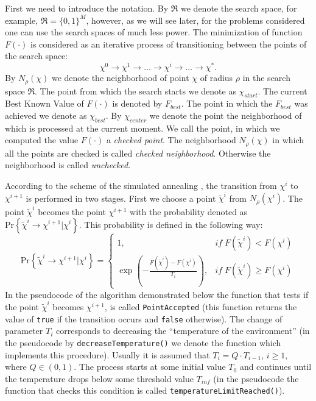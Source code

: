 \documentclass[runningheads,a4paper]{llncs}
\begin{document}
First we need to introduce the notation. By $\Re$ we denote the search space, for example, $\Re=\{0,1\}^M$, however, as we will see later, for the problems considered one can use the search spaces of much less power. The minimization of function $F(\cdot)$ is considered as an iterative process of transitioning between the points of the search space:
\begin{equation*}
\chi^0\rightarrow\chi^1\rightarrow\ldots\rightarrow\chi^i\rightarrow\ldots\rightarrow\chi^{\ast}.
\end{equation*}
By $N_{\rho}\left(\chi\right)$ we denote the neighborhood of point $\chi$ of radius $\rho$ in the search space $\Re$. The point from which the search starts we denote as $\chi_{start}$. The current Best Known Value of $F(\cdot)$ is denoted by $F_{best}$. The point in which the $F_{best}$ was achieved we denote as $\chi_{best}$. By $\chi_{center}$ we denote the point the neighborhood of which is processed at the current moment. We call the point, in which we computed the value $F(\cdot)$ a \textit{checked point}. The neighborhood $N_{\rho}\left(\chi\right)$ in which all the points are checked is called \textit{checked neighborhood}. Otherwise the neighborhood is called \textit{unchecked}. 

According to the scheme of the simulated annealing \cite{Kirkpatrick83optimizationby}, the transition from $\chi^i$ to $\chi^{i+1}$ is performed in two stages. First we choose a point $\tilde{\chi}^i$ from $N_{\rho}\left(\chi^i\right)$. The point $\tilde{\chi}^i$ becomes the point $\chi^{i+1}$ with the probability denoted as $\mathrm{Pr}\left\{\tilde{\chi}^i\rightarrow\chi^{i+1}|\chi^i\right\}$. This probability is defined in the following way:
\begin{equation*}
\mathrm{Pr}\left\{\tilde{\chi}^i\rightarrow\chi^{i+1}|\chi^i\right\}=\left\{
\begin{array}{cc}
1,& if\;F\left(\tilde{\chi}^i\right)<F\left(\chi^i\right)\\
\exp\left( -\frac{F\left(\tilde{\chi}^i\right)-F\left(\chi^i\right)}{T_i}\right),& if\;F\left(\tilde{\chi}^i\right)\geq F\left(\chi^i\right)
\end{array}
\right.
\end{equation*}
In the pseudocode of the algorithm demonstrated below the function that tests if the point $\tilde{\chi}^i$ becomes $\chi^{i+1}$, is called \texttt{PointAccepted} (this function returns the value of \texttt{true} if the transition occurs and \texttt{false} otherwise). The change of parameter $T_i$ corresponds to decreasing the ``temperature of the environment'' \cite{Kirkpatrick83optimizationby} (in the pseudocode by \texttt{decreaseTemperature()} we denote the function which implements this procedure). Usually it is assumed that $T_i=Q\cdot T_{i-1}$, $i\geq 1$, where $Q\in(0,1)$. The process starts at some initial value $T_0$ and continues until the temperature drops below some threshold value $T_{inf}$ (in the pseudocode the function that checks this condition is called \texttt{temperatureLimitReached()}). 
\end{document}
